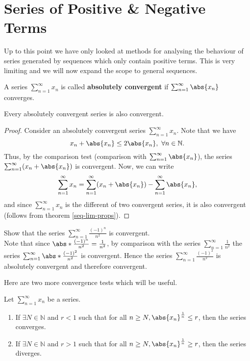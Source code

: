 \documentclass[../real_analysis.tex]{subfiles}
\begin{document}
    \section{Series of Positive \& Negative Terms}
        Up to this point we have only looked at methods for analysing the behaviour of series generated by sequences which only contain positive terms. This is very limiting and we will now expand the scope to general sequences.
        \begin{definition}
            A series $\sum_{n=1}^\infty x_n$ is called \textbf{absolutely convergent} if $\sum_{n=1}^\infty\abs{x_n}$ converges.
        \end{definition}
        \begin{theorem}
            Every absolutely convergent series is also convergent.
        \end{theorem}
        \begin{proof}
            Consider an absolutely convergent series $\sum_{n=1}^\infty x_n$. Note that we have
            \begin{equation}
                x_n+\abs{x_n}\leq2\abs{x_n},\ \forall n\in\mathbb{N}.
            \end{equation}
            Thus, by the comparison test (comparison with $\sum_{n=1}^\infty\abs{x_n}$), the series $\sum_{n=1}^\infty(x_n+\abs{x_n})$ is convergent. Now, we can write
            \begin{equation}
                \sum_{n=1}^\infty x_n=\sum_{n=1}^\infty(x_n+\abs{x_n})-\sum_{n=1}^\infty\abs{x_n},
            \end{equation}
            and since $\sum_{n=1}^\infty x_n$ is the different of two convergent series, it is also convergent (follows from theorem \ref{seq-lim-props}).
        \end{proof}
        \begin{example}
            Show that the series $\sum_{n=1}^\infty\frac{(-1)^n}{n^2}$ is convergent.\\
            Note that since $\abs*{\frac{(-1)^n}{n^2}}=\frac{1}{n^2}$, by comparison with the series $\sum_{n=1}^\infty\frac{1}{n^2}$ the series $\sum_{n=1}^\infty\abs*{\frac{(-1)^2}{n^2}}$ is convergent. Hence the series $\sum_{n=1}^\infty\frac{(-1)^2}{n^2}$ is absolutely convergent and therefore convergent.
        \end{example}
        Here are two more convergence tests which will be useful.
        \begin{theorem}\label{root-test}
            Let $\sum_{n=1}^\infty x_n$ be a series.
            \begin{enumerate}[label={\upshape(\roman*)}]
                \item If $\exists N\in\mathbb{N}$ and $r<1$ such that for all $n\geq N, \abs{x_n}^\frac{1}{n}\leq r$, then the series converges.
                \item If $\exists N\in\mathbb{N}$ and $r>1$ such that for all $n\geq N, \abs{x_n}^\frac{1}{n}\geq r$, then the series diverges.
            \end{enumerate}
        \end{theorem}
\end{document}
